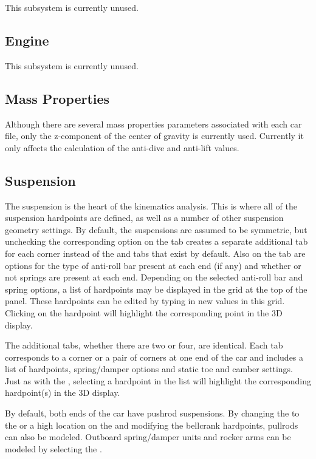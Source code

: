 This subsystem is currently unused.

\subsection{Engine} \label{ssec:engine}

This subsystem is currently unused.

\subsection{Mass Properties} \label{ssec:massProperties}

Although there are several mass properties parameters associated with each car file, only the z-component of the center of gravity is currently used.  Currently it only affects the calculation of the anti-dive and anti-lift values.

\subsection{Suspension} \label{ssec:suspension}

The suspension is the heart of the kinematics analysis.  This is where all of the suspension hardpoints are defined, as well as a number of other suspension geometry settings.  By default, the suspensions are assumed to be symmetric, but unchecking the corresponding option on the  tab creates a separate additional tab for each corner instead of the  and  tabs that exist by default.  Also on the  tab are options for the type of anti-roll bar present at each end (if any) and whether or not  springs are present at each end.  Depending on the selected anti-roll bar and  spring options, a list of hardpoints may be displayed in the grid at the top of the panel.  These hardpoints can be edited by typing in new values in this grid.  Clicking on the hardpoint will highlight the corresponding point in the 3D display.

The additional tabs, whether there are two or four, are identical.  Each tab corresponds to a corner or a pair of corners at one end of the car and includes a list of hardpoints, spring/damper options and static toe and camber settings.  Just as with the , selecting a hardpoint in the list will highlight the corresponding hardpoint(s) in the 3D display.

By default, both ends of the car have pushrod suspensions.  By changing the  to the  or a high location on the  and modifying the bellcrank hardpoints, pullrods can also be modeled.  Outboard spring/damper units and rocker arms can be modeled by selecting the  .

